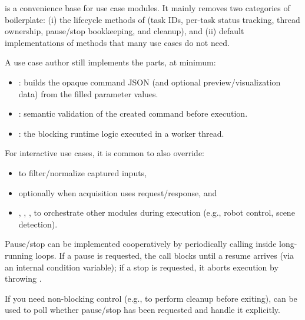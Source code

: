  is a convenience base for use case modules. It mainly removes two categories of boilerplate:
(i) the  lifecycle methods of  (task IDs, per-task status tracking, thread ownership, pause/stop bookkeeping, and  cleanup), and
(ii) default implementations of  methods that many use cases do not need.

A use case author still implements the \DIFdelbegin {}\DIFdelend \DIFaddbegin {}\DIFaddend parts, at minimum:
\begin{itemize}
    \item {}: builds the opaque command JSON (and optional preview/visualization data) from the filled parameter values.
    \item {}: semantic validation of the created command before execution.
    \item {}: the blocking runtime logic executed in a worker thread.
\end{itemize}

For interactive use cases, it is common to also override:
\begin{itemize}
    \item {} to filter/normalize captured inputs,
    \item optionally  when  acquisition uses request/response, and
    \item {}, , ,  to orchestrate other modules during execution (e.g., robot control, scene detection).
\end{itemize}

Pause/stop can be implemented cooperatively by periodically calling  inside long-running loops. If a pause is requested, the call blocks until a resume arrives (via an internal condition variable); if a stop is requested, it aborts execution by throwing .

If you need non-blocking control (e.g., to perform cleanup before exiting),  can be used to poll whether pause/stop has been requested and handle it explicitly.


